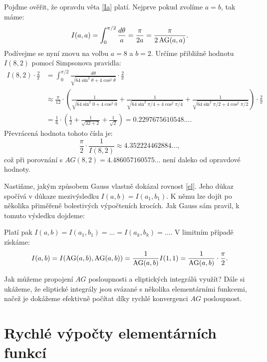 \documentclass[12pt]{report}
\begin{document}
\begin{priklad}
Pojďme ověřit, že opravdu věta \ref{Ia} platí. Nejprve pokud zvolíme $a=b$, tak máme:
$$I(a,a) = \int_{0}^{\pi/2} \frac{d \theta}{a} = \frac{\pi}{2 a} = \frac{\pi}{2 \operatorname{AG}(a,a)}.$$
Podívejme se nyní znovu na volbu $a= 8$ a $b=2$. Určíme přibližně hodnotu $I(8,2)$ pomocí Simpsonova pravidla:
\begin{align*}
I(8,2) \cdot \frac{2}{\pi} &= \int_{0}^{\pi/2} \frac{d \theta}{\sqrt{64 \sin ^2 \theta + 4 \cos ^2 \theta}} \cdot \frac{2}{\pi}\\
&\approx \frac{\pi}{12} \cdot \left( \frac{1}{\sqrt{64 \sin ^2 0 + 4 \cos ^2 0}} + \frac{1}{\sqrt{64 \sin ^2 \pi/4 + 4 \cos ^2 \pi/4}} + \frac{1}{\sqrt{64 \sin ^2 \pi/2 + 4 \cos ^2 \pi/2}} \right) \cdot \frac{2}{\pi}\\
&= \frac{1}{6} \cdot \left( \frac{1}{2} +\frac{1}{\sqrt{32+2}} + \frac{1}{\sqrt{2}}  \right) = 0.2297675610548\dots.
\end{align*}
Převrácená hodnota tohoto čísla je:
$$\frac{\pi}{2} \cdot \frac{1}{I(8,2)} \approx 4.352224462884\dots,$$
což při porovnání s $AG(8,2) = 4.486057160575\dots$ není daleko od opravdové hodnoty.
\end{priklad}

Nastiňme, jakým způsobem Gauss vlastně dokázal rovnost \eqref{el}. Jeho důkaz spočívá v důkaze mezivýsledku $I(a,b) = I(a_1,b_1)$. K němu lze dojít po několika přiměřeně bolestivých výpočteních krocích. Jak Gauss sám pravil, k tomuto výsledku dojdeme:

\begin{center}
\begin{verse}
\textit{}
\end{verse}
\end{center}
Platí pak $I(a,b) = I(a_1,b_1) = \dots = I(a_k,b_k) = \dots$. V limitním případě získáme: $$I(a,b) = I(\operatorname{AG}(a,b),\operatorname{AG}(a,b)) = \frac{1}{\operatorname{AG}(a,b)} I(1,1) = \frac{1}{\operatorname{AG}(a,b)} \cdot \frac{\pi}{2}.$$ 

Jak můžeme propojení $AG$ posloupnosti a eliptických integrálů využít? Dále si ukážeme, že eliptické integrály jsou svázané s několika elementárními funkcemi, načež je dokážeme efektivně počítat díky rychlé konvergenci $AG$ posloupnost.

\section{Rychlé výpočty elementárních funkcí}
\end{document}
